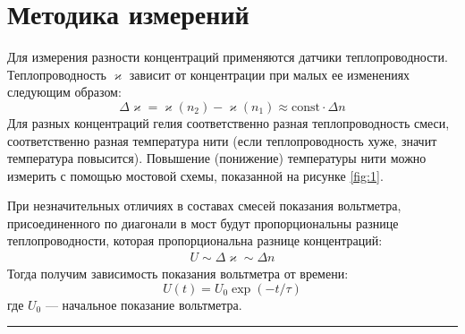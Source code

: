\documentclass[a4paper,12pt]{report}
\begin{document}
    \section{Методика измерений}
    \begin{multicols}{2}
        Для измерения разности концентраций применяются датчики теплопроводности. Теплопроводность $\varkappa$ зависит от концентрации при малых ее изменениях следующим образом:
        \begin{equation}
            \Delta\varkappa=\varkappa(n_2)-\varkappa(n_1)\approx\text{const}\cdot\Delta n
        \end{equation}
        Для разных концентраций гелия соответственно разная теплопроводность смеси, соответственно разная температура нити (если теплопроводность хуже, значит температура повысится). Повышение (понижение) температуры нити можно измерить с помощью мостовой схемы, показанной на рисунке \ref{fig:1}.

        При незначительных отличиях в составах смесей показания вольтметра, присоединенного по диагонали в мост будут пропорциональны разнице теплопроводности, которая пропорциональна разнице концентраций:
        \begin{gather*}
            U\sim\Delta\varkappa\sim\Delta n
        \end{gather*}
        Тогда получим зависимость показания вольтметра от времени:
        \begin{equation}
            U(t)=U_0\exp{(-t/\tau)}
        \end{equation}
        где $U_0$ --- начальное показание вольтметра.
    \end{multicols}
    \hrule 
    \newpage
\end{document}
